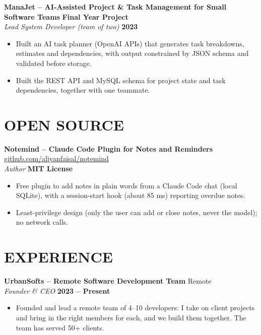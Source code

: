 \documentclass[a4paper,10pt]{article}
\begin{document}
\vspace{6pt}

\noindent \textbf{ManaJet -- AI-Assisted Project \& Task Management for Small Software Teams} \hfill \textbf{Final Year Project} \\
\textit{Lead System Developer (team of two)} \hfill \textbf{2023}
\begin{itemize}
    \item Built an AI task planner (OpenAI APIs) that generates task breakdowns, estimates and dependencies, with output constrained by JSON schema and validated before storage.
    \item Built the REST API and MySQL schema for project state and task dependencies, together with one teammate.
\end{itemize}

\section{OPEN SOURCE}

\noindent \textbf{Notemind -- Claude Code Plugin for Notes and Reminders} \hfill \href{https://github.com/aliyanfaisal/notemind}{github.com/aliyanfaisal/notemind} \\
\textit{Author} \hfill \textbf{MIT License}
\begin{itemize}
    \item Free plugin to add notes in plain words from a Claude Code chat (local SQLite), with a session-start hook (about 85 ms) reporting overdue notes.
    \item Least-privilege design (only the user can add or close notes, never the model); no network calls.
\end{itemize}

\section{EXPERIENCE}

\noindent \textbf{UrbanSofts -- Remote Software Development Team} \hfill Remote \\
\textit{Founder \& CEO} \hfill \textbf{2023 -- Present}
\begin{itemize}
    \item Founded and lead a remote team of 4--10 developers: I take on client projects and bring in the right members for each, and we build them together. The team has served 50+ clients.
\end{itemize}
\end{document}
